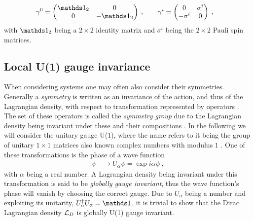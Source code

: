 \documentclass[../main.tex]{subfiles} %
\begin{document}
\begin{align}
    \gamma^0 &=
        \begin{pmatrix}
            \id_2 & 0 \\
            0 & -\id_2
        \end{pmatrix} \: , \qquad
    \gamma^i =
        \begin{pmatrix}
            0 & \sigma^i \\
            -\sigma^i & 0
        \end{pmatrix} \: ,
\end{align}
with $\id_2$ being a $2 \times 2$ identity matrix and $\sigma^i$ being the $2 \times 2$ Pauli spin matrices.




\subsection{Local U(1) gauge invariance} \label{sec:ContinuumQFT_LocalU(1)GaugeInvariance}

When considering systems one may often also consider their symmetries. Generally a \emph{symmetry} is written as an invariance of the action, and thus of the Lagrangian density, with respect to transformation represented by operators \cite{peskin_introToQFT_1995}. The set of these operators is called the \emph{symmetry group} due to the Lagrangian density being invariant under these and their compositions \cite{panyella_masterThesis_2019}. In the following we will consider the unitary gauge U(1), where the name refers to it being the group of unitary $1\times1$ matrices also known complex numbers with modulus $1$ \cite{peskin_introToQFT_1995}. One of these transformations is the phase of a wave function
\begin{align} \label{eq:GlobalU(1)GaugeInvariance}
    \psi &\rightarrow U_\alpha \psi = \exp{i\alpha}\psi \: ,
\end{align}
with $\alpha$ being a real number. A Lagrangian density being invariant under this transformation is said to be \emph{globally gauge invariant}, thus the wave function's phase will vanish by choosing the correct gauge. Due to $U_\alpha$ being a number and exploiting its unitarity, $U_\alpha\dagger U_\alpha = \id$, it is trivial to show that the Dirac Lagrangian density $\mathcal{L}_D$ is globally U(1) gauge invariant.
\end{document}
